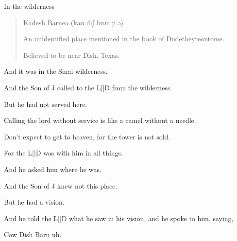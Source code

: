 
{ \hX{} }
{ \eX{} }
{
    \begin{center}
        {\Large {}\par}
        \vspace{0.4em}
        {\large In the wilderness\par}
    \end{center}
    \begin{quote}
        Kadesh Barnea (kaʊ dɪʃ bɑɹn.ji.ə)

        An unidentified place mentioned in the book of Dudetheyreontome.

        Believed to be near Dish, Texas.
    \end{quote}
}
{ \hX{} }
{ \eX{} }
{
    And it was in the Sinai wilderness.
    \begin{center}
    \end{center}
    And the Son of J called to the L||D from the wilderness.

    But he had not served here.
}
{ \hX{} }
{ \eX{} }
{
    Calling the lord without service is like a camel without a needle.

    Don't expect to get to heaven, for the tower is not sold.


    For the L||D was with him in all things.
}
{ \hX{} }
{ \eX{} }
{
    And he asked him where he was.

    And the Son of J knew not this place.

    But he had a vision.

    And he told the L||D what he saw in his vision, and he spoke to him, saying,
}
{ \hX{} }
{ \eX{} }
{
    Cow Dish Barn uh.
    \begin{center}
    \end{center}
}

